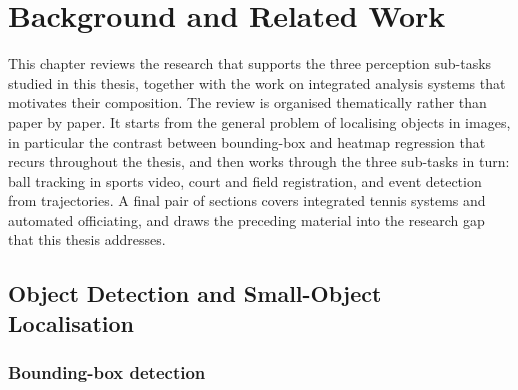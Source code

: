 \chapter{Background and Related Work}
\label{ch:related-work}

This chapter reviews the research that supports the three perception
sub-tasks studied in this thesis, together with the work on integrated
analysis systems that motivates their composition. The review is organised
thematically rather than paper by paper. It starts from the general problem
of localising objects in images, in particular the contrast between
bounding-box and heatmap regression that recurs throughout the thesis, and
then works through the three sub-tasks in turn: ball tracking in sports
video, court and field registration, and event detection from trajectories.
A final pair of sections covers integrated tennis systems and automated
officiating, and draws the preceding material into the research gap that
this thesis addresses.

\section{Object Detection and Small-Object Localisation}
\label{sec:rw-detection}

\subsection{Bounding-box detection}
\label{sec:rw-bbox}

